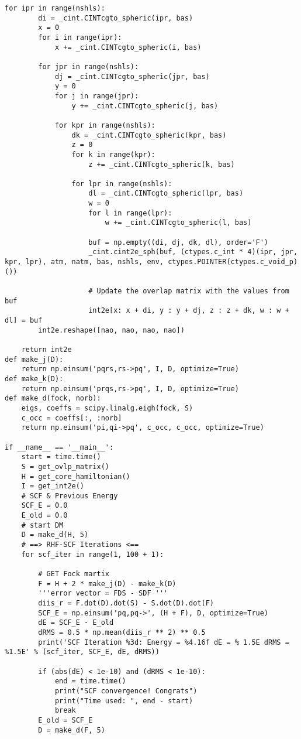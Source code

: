 \documentclass[12pt, a4paper, oneside]{ctexart}
\begin{document}
\begin{appendices}
\begin{lstlisting}[style = Python]
    for ipr in range(nshls):
        di = _cint.CINTcgto_spheric(ipr, bas)
        x = 0
        for i in range(ipr):
            x += _cint.CINTcgto_spheric(i, bas)

        for jpr in range(nshls):
            dj = _cint.CINTcgto_spheric(jpr, bas)
            y = 0
            for j in range(jpr):
                y += _cint.CINTcgto_spheric(j, bas)

            for kpr in range(nshls):
                dk = _cint.CINTcgto_spheric(kpr, bas)
                z = 0
                for k in range(kpr):
                    z += _cint.CINTcgto_spheric(k, bas)

                for lpr in range(nshls):
                    dl = _cint.CINTcgto_spheric(lpr, bas)
                    w = 0
                    for l in range(lpr):
                        w += _cint.CINTcgto_spheric(l, bas)

                    buf = np.empty((di, dj, dk, dl), order='F')
                    _cint.cint2e_sph(buf, (ctypes.c_int * 4)(ipr, jpr, kpr, lpr), atm, natm, bas, nshls, env, ctypes.POINTER(ctypes.c_void_p)())

                    # Update the overlap matrix with the values from buf
                    int2e[x: x + di, y : y + dj, z : z + dk, w : w + dl] = buf
        int2e.reshape([nao, nao, nao, nao])
        
    return int2e
def make_j(D):
    return np.einsum('pqrs,rs->pq', I, D, optimize=True) 
def make_k(D):
    return np.einsum('prqs,rs->pq', I, D, optimize=True)  
def make_d(fock, norb):
    eigs, coeffs = scipy.linalg.eigh(fock, S)
    c_occ = coeffs[:, :norb]
    return np.einsum('pi,qi->pq', c_occ, c_occ, optimize=True)

if __name__ == '__main__':
    start = time.time()
    S = get_ovlp_matrix()   
    H = get_core_hamiltonian()
    I = get_int2e()
    # SCF & Previous Energy
    SCF_E = 0.0
    E_old = 0.0
    # start DM
    D = make_d(H, 5)
    # ==> RHF-SCF Iterations <==
    for scf_iter in range(1, 100 + 1):

        # GET Fock martix
        F = H + 2 * make_j(D) - make_k(D)
        '''error vector = FDS - SDF '''
        diis_r = F.dot(D).dot(S) - S.dot(D).dot(F)
        SCF_E = np.einsum('pq,pq->', (H + F), D, optimize=True)
        dE = SCF_E - E_old
        dRMS = 0.5 * np.mean(diis_r ** 2) ** 0.5
        print('SCF Iteration %3d: Energy = %4.16f dE = % 1.5E dRMS = %1.5E' % (scf_iter, SCF_E, dE, dRMS))

        if (abs(dE) < 1e-10) and (dRMS < 1e-10):
            end = time.time()
            print("SCF convergence! Congrats")
            print("Time used: ", end - start)
            break
        E_old = SCF_E
        D = make_d(F, 5)
        
  
\end{lstlisting}
\end{appendices}
\end{document}
